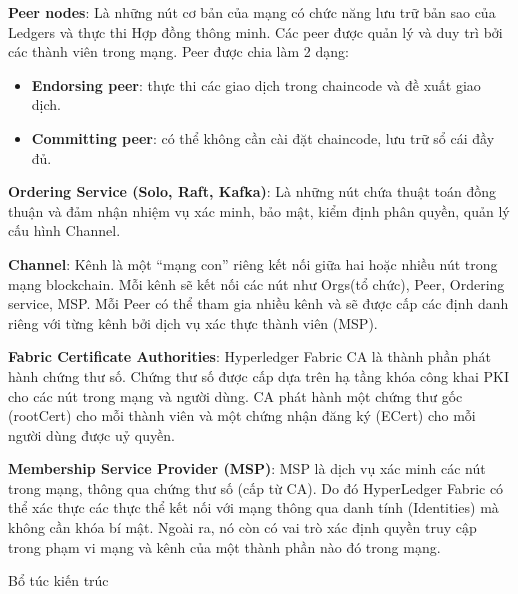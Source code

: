 \textbf{Peer nodes}: Là những nút cơ bản của mạng có chức năng lưu trữ bản sao của Ledgers và thực thi Hợp đồng thông minh. Các peer được quản lý và duy trì bởi các thành viên trong mạng. Peer được chia làm 2 dạng:

\begin{itemize}
\item \textbf{Endorsing peer}: thực thi các giao dịch trong chaincode và đề xuất giao dịch.
\item \textbf{Committing peer}: có thể không cần cài đặt chaincode, lưu trữ sổ cái đầy đủ.
\end{itemize}

\textbf{Ordering Service (Solo, Raft, Kafka)}: Là những nút chứa thuật toán đồng thuận và đảm nhận nhiệm vụ xác minh, bảo mật, kiểm định phân quyền, quản lý cấu hình Channel.

\textbf{Channel}: Kênh là một “mạng con” riêng kết nối giữa hai hoặc nhiều nút trong mạng blockchain. Mỗi kênh sẽ kết nối các nút như Orgs(tổ chức), Peer, Ordering service, MSP. Mỗi Peer có thể tham gia nhiều kênh và sẽ được cấp các định danh riêng với từng kênh bởi dịch vụ xác thực thành viên (MSP).

\textbf{Fabric Certificate Authorities}: Hyperledger Fabric CA là thành phần phát hành chứng thư số. Chứng thư số được cấp dựa trên hạ tầng khóa công khai PKI cho các nút trong mạng và người dùng. CA phát hành một chứng thư gốc (rootCert) cho mỗi thành viên và một chứng nhận đăng ký (ECert) cho mỗi người dùng được uỷ quyền.

\textbf{Membership Service Provider (MSP)}: MSP là dịch vụ xác minh các nút trong mạng, thông qua chứng thư số (cấp từ CA). Do đó HyperLedger Fabric có thể xác thực các thực thể kết nối với mạng thông qua danh tính (Identities) mà không cần khóa bí mật. Ngoài ra, nó còn có vai trò xác định quyền truy cập trong phạm vi mạng và kênh của một thành phần nào đó trong mạng.

Bổ túc kiến trúc
